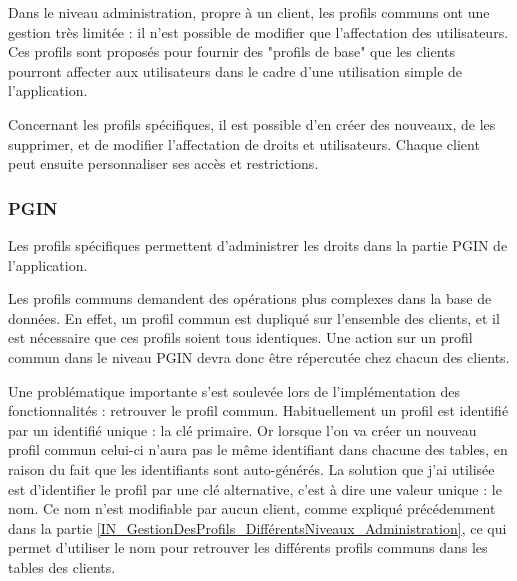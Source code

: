 Dans le niveau administration, propre à un client, les profils communs ont une gestion très limitée : il n'est possible de modifier que l'affectation des utilisateurs.
Ces profils sont proposés pour fournir des "profils de base" que les clients pourront affecter aux utilisateurs dans le cadre d'une utilisation simple de l'application.

Concernant les profils spécifiques, il est possible d'en créer des nouveaux, de les supprimer, et de modifier l'affectation de droits et utilisateurs.
Chaque client peut ensuite personnaliser ses accès et restrictions.


\subsubsection{PGIN}

Les profils spécifiques permettent d'administrer les droits dans la partie PGIN de l'application.

Les profils communs demandent des opérations plus complexes dans la base de données.
En effet, un profil commun est dupliqué sur l'ensemble des clients, et il est nécessaire que ces profils soient tous identiques.
Une action sur un profil commun dans le niveau PGIN devra donc être répercutée chez chacun des clients.

Une problématique importante s'est soulevée lors de l'implémentation des fonctionnalités : retrouver le profil commun.
Habituellement un profil est identifié par un identifié unique : la clé primaire.
Or lorsque l'on va créer un nouveau profil commun celui-ci n'aura pas le même identifiant dans chacune des tables, en raison du fait que les identifiants sont auto-générés.
La solution que j'ai utilisée est d'identifier le profil par une clé alternative, c'est à dire une valeur unique : le nom.
Ce nom n'est modifiable par aucun client, comme expliqué précédemment dans la partie \ref{IN_GestionDesProfils_DifférentsNiveaux_Administration}, ce qui permet d'utiliser le nom pour retrouver les différents profils communs dans les tables des clients.
